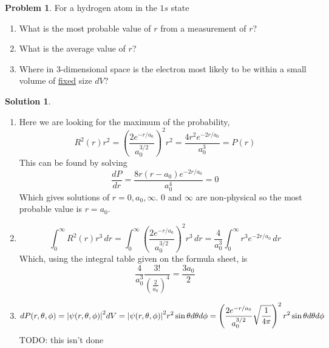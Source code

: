 \documentclass[10pt]{article}
\theoremstyle{definition}
\newtheorem{problem}{Problem}
\newtheorem{soln}{Solution}
\begin{document}
\begin{problem}
For a hydrogen atom in the $1s$ state
\begin{enumerate}[label=(\alph*)]
  \item What is the most probable value of $r$ from a measurement of $r$?
  \item What is the average value of $r$?
  \item Where in 3-dimensional space is the electron most likely to be within a small volume of \underline{fixed} size $dV$?
\end{enumerate}
\end{problem}
\begin{soln}~
  \begin{enumerate}[label=(\alph*)]
    \item Here we are looking for the maximum of the probability,
          $$R^2(r)r^2=\left(\frac{2e^{-r/a_0}}{a_0^{3/2}}\right)^2r^2=\frac{4r^2e^{-2r/a_0}}{a_0^3}=P(r)$$
          This can be found by solving
          $$\frac{dP}{dr}=\frac{8r(r-a_0)e^{-2r/a_0}}{a_0^4}=0$$
          Which gives solutions of $r=0,a_0,\infty$. $0$ and $\infty$ are non-physical so the most probable value is $r=a_0$.
    \item $$\int_0^\infty R^2(r)r^3\,dr
            =\int_0^\infty\left(\frac{2e^{-r/a_0}}{a_0^{3/2}}\right)^2r^3\,dr
            =\frac{4}{a_0^{3}}\int_0^\infty r^3e^{-2r/a_0}\,dr$$
          Which, using the integral table given on the formula sheet, is
          $$\frac{4}{a_0^{3}}\frac{3!}{\left(\frac{2}{a_0}\right)^4}=\frac{3a_0}{2}$$
    \item $$dP(r,\theta,\phi)=\abs{\psi(r,\theta,\phi)}^2dV=\abs{\psi(r,\theta,\phi)}^2r^2\sin\theta d\theta d\phi
            =\left(\frac{2e^{-r/a_0}}{a_0^{3/2}}\sqrt{\frac{1}{4\pi}}\right)^2r^2\sin\theta d\theta d\phi
          $$
          TODO: this isn't done
  \end{enumerate}
\end{soln}
\end{document}
